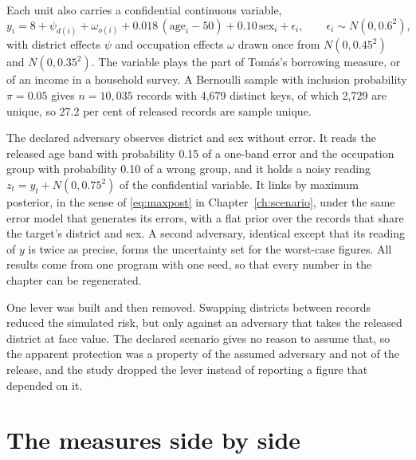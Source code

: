 Each unit also carries a confidential continuous variable,
\begin{equation}\label{c11:eq-y}
y_i = 8 + \psi_{d(i)} + \omega_{o(i)} + 0.018\,(\mathrm{age}_i - 50)
+ 0.10\,\mathrm{sex}_i + \epsilon_i ,\qquad \epsilon_i \sim N(0, 0.6^2),
\end{equation}
with district effects $\psi$ and occupation effects $\omega$ drawn once from
$N(0, 0.45^2)$ and $N(0, 0.35^2)$.
The variable plays the part of Tomás's borrowing measure, or of an income in a
household survey. A Bernoulli sample with inclusion probability $\pi = 0.05$ gives
$n = 10{,}035$ records with 4,679 distinct keys, of which 2,729 are unique, so 27.2
per cent of released records are sample unique.

The declared adversary observes district and sex without error. It reads the
released age band with probability 0.15 of a one-band error and the occupation
group with probability 0.10 of a wrong group, and it holds a noisy reading
$z_t = y_t + N(0, 0.75^2)$ of the confidential variable.
It links by maximum posterior, in the sense of \eqref{eq:maxpost} in
Chapter~\ref{ch:scenario}, under the same error model that generates its errors,
with a flat prior over the records that share the target's district and sex. A
second adversary, identical except that its reading of $y$ is twice as precise,
forms the uncertainty set for the worst-case figures. All results come from one
program with one seed, so that every number in the chapter can be regenerated.

One lever was built and then removed. Swapping districts between records reduced
the simulated risk, but only against an adversary that takes the released district
at face value. The declared scenario gives no reason to assume that, so the
apparent protection was a property of the assumed adversary and not of the
release, and the study dropped the lever instead of reporting a figure that
depended on it.

\section{The measures side by side}

